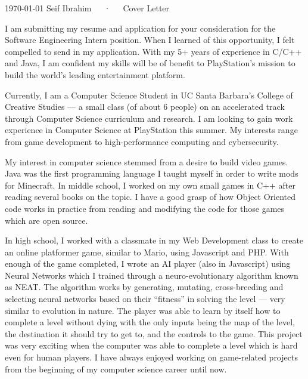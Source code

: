 \documentclass[11pt, letterpaper]{awesome-cv}
\begin{document}
\makecvheader[R]

\makecvfooter
  {\today}
  {Seif Ibrahim~~~·~~~Cover Letter}
  {\mbox{}}

  \makelettertitle

\begin{cvletter}

I am submitting my resume and application for your consideration for the Software Engineering Intern position. When I learned of this opportunity, I felt compelled to send in my application. With my 5+ years of experience in C/C++ and Java, I am confident my skills will be of benefit to PlayStation's mission to build the world's leading entertainment platform. 

Currently, I am a Computer Science Student in UC Santa Barbara's College of Creative Studies --- a small class (of about 6 people) on an accelerated track through Computer Science curriculum and research. I am looking to gain work experience in Computer Science at PlayStation this summer. My interests range from game development to high-performance computing and cybersecurity. 

My interest in computer science stemmed from a desire to build video games. Java was the first programming language I taught myself in order to write mods for Minecraft. In middle school, I worked on my own small games in C++ after reading several books on the topic. I have a good grasp of how Object Oriented code works in practice from reading and modifying the code for those games which are open source.

In high school, I worked with a classmate in my Web Development class to create an online platformer game, similar to Mario, using Javascript and PHP. With enough of the game completed, I wrote an AI player (also in Javascript) using Neural Networks which I trained through a neuro-evolutionary algorithm known as NEAT. The algorithm works by generating, mutating, cross-breeding and selecting neural networks based on their ``fitness'' in solving the level --- very similar to evolution in nature. The player was able to learn by itself how to complete a level without dying with the only inputs being the map of the level, the destination it should try to get to, and the controls to the game. This project was very exciting when the computer was able to complete a level which is hard even for human players. I have always enjoyed working on game-related projects from the beginning of my computer science career until now.


\end{cvletter}
\end{document}
